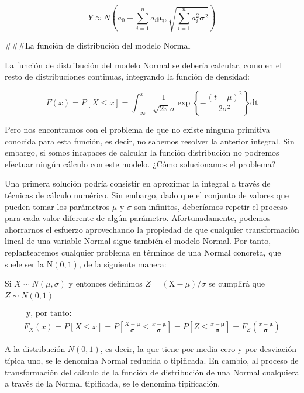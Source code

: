 \documentclass[
]{article}
\begin{document}
\[
Y \approx N\left(a_{0}+\sum_{i=1}^{n} a_{i} \boldsymbol{\mu}_{i}, \sqrt{\sum_{i=1}^{n} a_{i}^{2} \boldsymbol{\sigma}^{2}}\right)
\]

\#\#\#La función de distribución del modelo Normal

La función de distribución del modelo Normal se debería calcular, como en el resto de distribuciones continuas, integrando la función de densidad:

\[
F(x)=P[X \leq x]=\int_{-\infty}^{x} \frac{1}{\sqrt{2 \pi} \sigma} \exp \left\{-\frac{(t-\mu)^{2}}{2 \sigma^{2}}\right\} \mathrm{dt}
\]

Pero nos encontramos con el problema de que no existe ninguna primitiva conocida para esta función, es decir, no sabemos resolver la anterior integral. Sin embargo, si somos incapaces de calcular la función distribución no podremos efectuar ningún cálculo con este modelo. ¿Cómo solucionamos el problema?

Una primera solución podría consistir en aproximar la integral a través de técnicas de cálculo numérico. Sin embargo, dado que el conjunto de valores que pueden tomar los parámetros \(\mu\) y \(\sigma\) son infinitos, deberíamos repetir el proceso para cada valor diferente de algún parámetro. Afortunadamente, podemos ahorrarnos el esfuerzo aprovechando la propiedad de que cualquier transformación lineal de una variable Normal sigue también el modelo Normal. Por tanto, replantearemos cualquier problema en términos de una Normal concreta, que suele ser la \(\mathrm{N}(0,1)\), de la siguiente manera:

Si \(X \sim N(\mu, \sigma)\) y entonces definimos \(Z=(\mathrm{X}-\mu) / \sigma\) se cumplirá que \(Z \sim N(0,1)\)

\[
\begin{gathered}
\text { y, por tanto: } \\
F_{X}(x)=P[X \leq x]=P\left[\frac{X-\boldsymbol{\mu}}{\boldsymbol{\sigma}} \leq \frac{x-\boldsymbol{\mu}}{\boldsymbol{\sigma}}\right]=P\left[Z \leq \frac{x-\boldsymbol{\mu}}{\boldsymbol{\sigma}}\right]=F_{Z}\left(\frac{x-\boldsymbol{\mu}}{\boldsymbol{\sigma}}\right)
\end{gathered}
\]

A la distribución \(N(0,1)\), es decir, la que tiene por media cero y por desviación típica uno, se le denomina Normal reducida o tipificada. En cambio, al proceso de transformación del cálculo de la función de distribución de una Normal cualquiera a través de la Normal tipificada, se le denomina tipificación.
\end{document}
